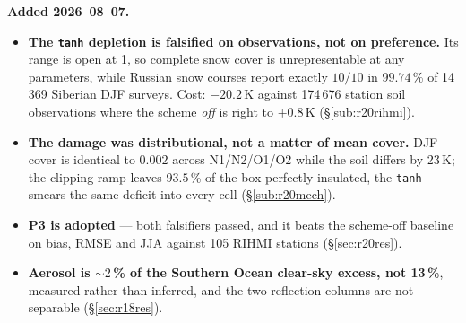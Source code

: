 \documentclass[10pt]{article}
\begin{document}
\textbf{Added 2026--08--07.}
\begin{itemize}\itemsep2pt
\item \textbf{The \texttt{tanh} depletion is falsified on observations, not on preference.}
Its range is open at 1, so complete snow cover is unrepresentable at any parameters, while
Russian snow courses report exactly $10/10$ in $99.74$\,\% of 14\,369 Siberian DJF surveys.
Cost: $-20.2$\,K against 174\,676 station soil observations where the scheme \emph{off} is
right to $+0.8$\,K (\S\ref{sub:r20rihmi}).
\item \textbf{The damage was distributional, not a matter of mean cover.} DJF cover is
identical to $0.002$ across N1/N2/O1/O2 while the soil differs by 23\,K; the clipping ramp
leaves $93.5$\,\% of the box perfectly insulated, the \texttt{tanh} smears the same deficit
into every cell (\S\ref{sub:r20mech}).
\item \textbf{P3 is adopted} --- both falsifiers passed, and it beats the scheme-off
baseline on bias, RMSE and JJA against 105 RIHMI stations (\S\ref{sec:r20res}).
\item \textbf{Aerosol is ${\sim}2$\,\% of the Southern Ocean clear-sky excess, not 13\,\%},
measured rather than inferred, and the two reflection columns are not separable
(\S\ref{sec:r18res}).
\end{itemize}
\end{document}
